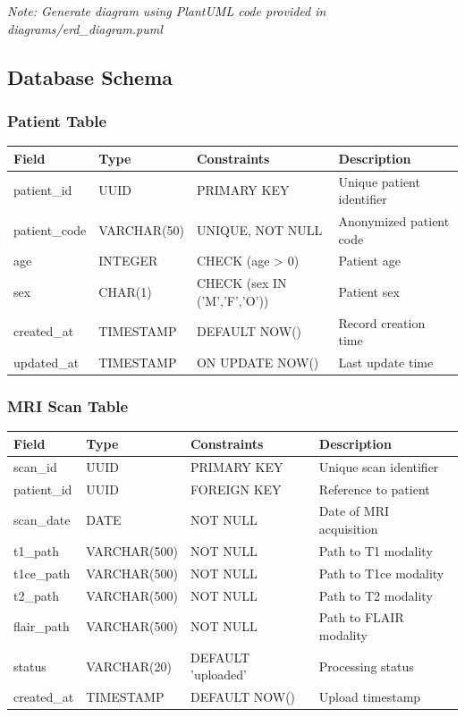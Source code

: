 \documentclass[12pt,a4paper]{article}
\begin{document}
\textit{Note: Generate diagram using PlantUML code provided in diagrams/erd\_diagram.puml}

\subsection{Database Schema}

\subsubsection{Patient Table}
\begin{table}[H]
\centering
\begin{tabularx}{\textwidth}{|l|l|l|X|}
\hline
\textbf{Field} & \textbf{Type} & \textbf{Constraints} & \textbf{Description} \\
\hline
patient\_id & UUID & PRIMARY KEY & Unique patient identifier \\
patient\_code & VARCHAR(50) & UNIQUE, NOT NULL & Anonymized patient code \\
age & INTEGER & CHECK (age > 0) & Patient age \\
sex & CHAR(1) & CHECK (sex IN ('M','F','O')) & Patient sex \\
created\_at & TIMESTAMP & DEFAULT NOW() & Record creation time \\
updated\_at & TIMESTAMP & ON UPDATE NOW() & Last update time \\
\hline
\end{tabularx}
\end{table}

\subsubsection{MRI Scan Table}
\begin{table}[H]
\centering
\begin{tabularx}{\textwidth}{|l|l|l|X|}
\hline
\textbf{Field} & \textbf{Type} & \textbf{Constraints} & \textbf{Description} \\
\hline
scan\_id & UUID & PRIMARY KEY & Unique scan identifier \\
patient\_id & UUID & FOREIGN KEY & Reference to patient \\
scan\_date & DATE & NOT NULL & Date of MRI acquisition \\
t1\_path & VARCHAR(500) & NOT NULL & Path to T1 modality \\
t1ce\_path & VARCHAR(500) & NOT NULL & Path to T1ce modality \\
t2\_path & VARCHAR(500) & NOT NULL & Path to T2 modality \\
flair\_path & VARCHAR(500) & NOT NULL & Path to FLAIR modality \\
status & VARCHAR(20) & DEFAULT 'uploaded' & Processing status \\
created\_at & TIMESTAMP & DEFAULT NOW() & Upload timestamp \\
\hline
\end{tabularx}
\end{table}
\end{document}
